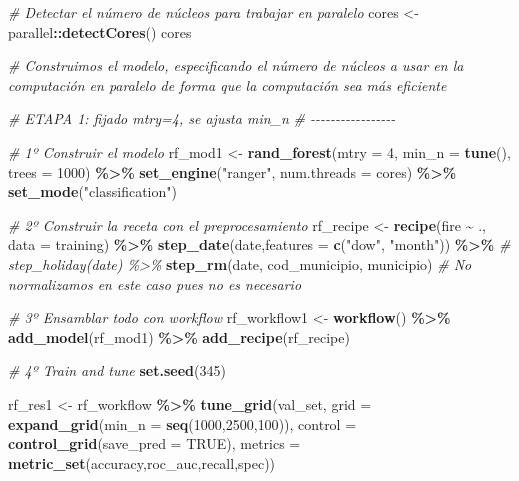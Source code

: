 \documentclass[12pt,a4paper,]{book}
\newenvironment{Shaded}{\begin{snugshade}}{\end{snugshade}}
\newcommand{\AttributeTok}[1]{\textcolor[rgb]{0.13,0.29,0.53}{#1}}
\newcommand{\CommentTok}[1]{\textcolor[rgb]{0.56,0.35,0.01}{\textit{#1}}}
\newcommand{\ConstantTok}[1]{\textcolor[rgb]{0.56,0.35,0.01}{#1}}
\newcommand{\DecValTok}[1]{\textcolor[rgb]{0.00,0.00,0.81}{#1}}
\newcommand{\FunctionTok}[1]{\textcolor[rgb]{0.13,0.29,0.53}{\textbf{#1}}}
\newcommand{\NormalTok}[1]{#1}
\newcommand{\OtherTok}[1]{\textcolor[rgb]{0.56,0.35,0.01}{#1}}
\newcommand{\SpecialCharTok}[1]{\textcolor[rgb]{0.81,0.36,0.00}{\textbf{#1}}}
\newcommand{\StringTok}[1]{\textcolor[rgb]{0.31,0.60,0.02}{#1}}
\numberwithin{dummy}{section}
\theoremstyle{ocrenumbox}
\theoremstyle{blacknumex}
\theoremstyle{blacknumbox}
\theoremstyle{ocrenum}
\theoremstyle{ocrenum}
\begin{document}
\begin{Shaded}
\begin{Highlighting}[]
\CommentTok{\# Detectar el número de núcleos para trabajar en paralelo}
\NormalTok{cores }\OtherTok{\textless{}{-}}\NormalTok{ parallel}\SpecialCharTok{::}\FunctionTok{detectCores}\NormalTok{()}
\NormalTok{cores}

\CommentTok{\# Construimos el modelo, especificando el número de núcleos a usar en la computación en paralelo de forma que la computación sea más eficiente}

\CommentTok{\# ETAPA 1: fijado mtry=4, se ajusta min\_n}
\CommentTok{\# {-}{-}{-}{-}{-}{-}{-}{-}{-}{-}{-}{-}{-}{-}{-}{-}{-}}

\CommentTok{\# 1º Construir el modelo}
\NormalTok{rf\_mod1 }\OtherTok{\textless{}{-}} 
  \FunctionTok{rand\_forest}\NormalTok{(}\AttributeTok{mtry =} \DecValTok{4}\NormalTok{, }\AttributeTok{min\_n =} \FunctionTok{tune}\NormalTok{(), }\AttributeTok{trees =} \DecValTok{1000}\NormalTok{) }\SpecialCharTok{\%\textgreater{}\%} 
  \FunctionTok{set\_engine}\NormalTok{(}\StringTok{"ranger"}\NormalTok{, }\AttributeTok{num.threads =}\NormalTok{ cores) }\SpecialCharTok{\%\textgreater{}\%} 
  \FunctionTok{set\_mode}\NormalTok{(}\StringTok{"classification"}\NormalTok{)}

\CommentTok{\# 2º Construir la receta con el preprocesamiento}
\NormalTok{rf\_recipe }\OtherTok{\textless{}{-}} 
  \FunctionTok{recipe}\NormalTok{(fire }\SpecialCharTok{\textasciitilde{}}\NormalTok{ ., }\AttributeTok{data =}\NormalTok{ training) }\SpecialCharTok{\%\textgreater{}\%} 
  \FunctionTok{step\_date}\NormalTok{(date,}\AttributeTok{features =} \FunctionTok{c}\NormalTok{(}\StringTok{"dow"}\NormalTok{, }\StringTok{"month"}\NormalTok{)) }\SpecialCharTok{\%\textgreater{}\%} 
  \CommentTok{\# step\_holiday(date) \%\textgreater{}\% }
  \FunctionTok{step\_rm}\NormalTok{(date, cod\_municipio, municipio) }
\CommentTok{\# No normalizamos en este caso pues no es necesario}

\CommentTok{\# 3º Ensamblar todo con workflow}
\NormalTok{rf\_workflow1 }\OtherTok{\textless{}{-}} 
  \FunctionTok{workflow}\NormalTok{() }\SpecialCharTok{\%\textgreater{}\%} 
  \FunctionTok{add\_model}\NormalTok{(rf\_mod1) }\SpecialCharTok{\%\textgreater{}\%} 
  \FunctionTok{add\_recipe}\NormalTok{(rf\_recipe)}

\CommentTok{\# 4º Train and tune}
\FunctionTok{set.seed}\NormalTok{(}\DecValTok{345}\NormalTok{)}

\NormalTok{rf\_res1 }\OtherTok{\textless{}{-}}
\NormalTok{  rf\_workflow }\SpecialCharTok{\%\textgreater{}\%}
  \FunctionTok{tune\_grid}\NormalTok{(val\_set,}
            \AttributeTok{grid =} \FunctionTok{expand\_grid}\NormalTok{(}\AttributeTok{min\_n =} \FunctionTok{seq}\NormalTok{(}\DecValTok{1000}\NormalTok{,}\DecValTok{2500}\NormalTok{,}\DecValTok{100}\NormalTok{)),}
            \AttributeTok{control =} \FunctionTok{control\_grid}\NormalTok{(}\AttributeTok{save\_pred =} \ConstantTok{TRUE}\NormalTok{),}
            \AttributeTok{metrics =} \FunctionTok{metric\_set}\NormalTok{(accuracy,roc\_auc,recall,spec))}


\end{Highlighting}
\end{Shaded}
\end{document}
